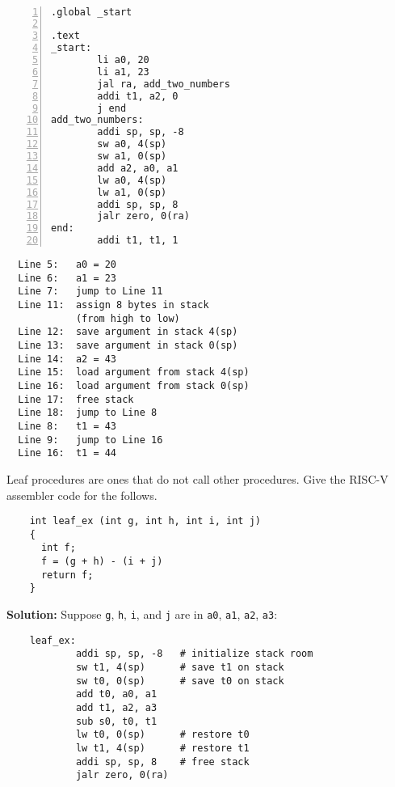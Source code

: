 \begin{eg}~

\begin{minipage}{0.45\textwidth}
\begin{Verbatim}[numbers=left,xleftmargin=5mm]
.global _start

.text
_start:
        li a0, 20
        li a1, 23
        jal ra, add_two_numbers 
        addi t1, a2, 0
        j end 
add_two_numbers:
        addi sp, sp, -8
        sw a0, 4(sp)
        sw a1, 0(sp)
        add a2, a0, a1
        lw a0, 4(sp)
        lw a1, 0(sp)
        addi sp, sp, 8
        jalr zero, 0(ra)
end:    
        addi t1, t1, 1
\end{Verbatim}
\end{minipage}
\begin{minipage}{0.55\textwidth}
\color{red}
\begin{verbatim}
  Line 5:   a0 = 20
  Line 6:   a1 = 23
  Line 7:   jump to Line 11
  Line 11:  assign 8 bytes in stack 
            (from high to low)
  Line 12:  save argument in stack 4(sp)
  Line 13:  save argument in stack 0(sp)
  Line 14:  a2 = 43
  Line 15:  load argument from stack 4(sp)
  Line 16:  load argument from stack 0(sp)
  Line 17:  free stack
  Line 18:  jump to Line 8
  Line 8:   t1 = 43
  Line 9:   jump to Line 16
  Line 16:  t1 = 44
\end{verbatim}
\end{minipage}
\end{eg}

\begin{eg}
  Leaf procedures are ones that do not call other procedures. Give the RISC-V assembler code for the follows. 
  \begin{verbatim}
    int leaf_ex (int g, int h, int i, int j)
    {
      int f;
      f = (g + h) - (i + j)
      return f;
    }
  \end{verbatim}

  \textbf{Solution:} 
  Suppose \verb|g|, \verb|h|, \verb|i|, and \verb|j| are in \verb|a0|, \verb|a1|, \verb|a2|, \verb|a3|: 
  \begin{verbatim}
    leaf_ex: 
            addi sp, sp, -8   # initialize stack room
            sw t1, 4(sp)      # save t1 on stack
            sw t0, 0(sp)      # save t0 on stack
            add t0, a0, a1
            add t1, a2, a3
            sub s0, t0, t1
            lw t0, 0(sp)      # restore t0
            lw t1, 4(sp)      # restore t1
            addi sp, sp, 8    # free stack
            jalr zero, 0(ra)
  \end{verbatim}
\end{eg}

